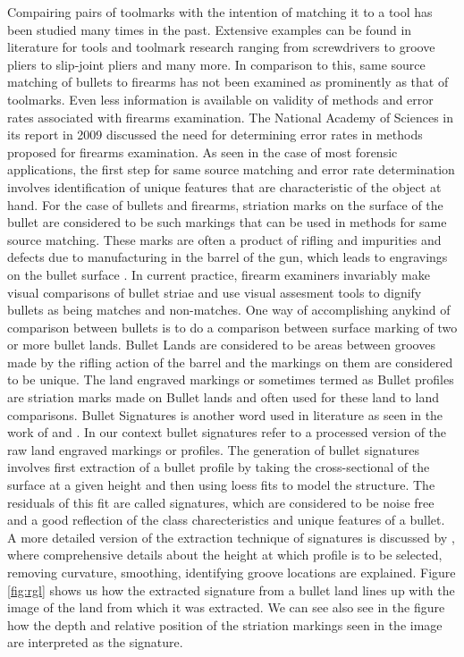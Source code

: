\documentclass[12pt]{article}
\begin{document}
Compairing pairs of toolmarks with the intention of matching it to a
tool has been studied many times in the past. Extensive examples can be
found in literature for tools and toolmark research ranging from
screwdrivers \citep{manytoolmarks1, manytoolmarks2, chumbley} to groove
pliers \citep{manytoolmarks2} to slip-joint pliers \citep{afte-chumbley}
and many more. In comparison to this, same source matching of bullets to
firearms has not been examined as prominently as that of toolmarks. Even
less information is available on validity of methods and error rates
associated with firearms examination. The National Academy of Sciences
in its report in 2009 \citep{NAS:2009} discussed the need for
determining error rates in methods proposed for firearms examination. As
seen in the case of most forensic applications, the first step for same
source matching and error rate determination involves identification of
unique features that are characteristic of the object at hand. For the
case of bullets and firearms, striation marks on the surface of the
bullet are considered to be such markings that can be used in methods
for same source matching. These marks are often a product of rifling and
impurities and defects due to manufacturing in the barrel of the gun,
which leads to engravings on the bullet surface
\citep{afte-article1992}. In current practice, firearm examiners
invariably make visual comparisons of bullet striae and use visual
assesment tools to dignify bullets as being matches and non-matches. One
way of accomplishing anykind of comparison between bullets is to do a
comparison between surface marking of two or more bullet lands. Bullet
Lands are considered to be areas between grooves made by the rifling
action of the barrel and the markings on them are considered to be
unique. The land engraved markings or sometimes termed as Bullet
profiles \citep{aoas} are striation marks made on Bullet lands and often
used for these land to land comparisons. Bullet Signatures is another
word used in literature as seen in the work of \citet{chu2013} and
\citet{aoas}. In our context bullet signatures refer to a processed
version of the raw land engraved markings or profiles. The generation of
bullet signatures involves first extraction of a bullet profile by
taking the cross-sectional of the surface at a given height and then
using loess fits to model the structure. The residuals of this fit are
called signatures, which are considered to be noise free and a good
reflection of the class charecteristics and unique features of a bullet.
A more detailed version of the extraction technique of signatures is
discussed by \citet{aoas}, where comprehensive details about the height
at which profile is to be selected, removing curvature, smoothing,
identifying groove locations are explained. Figure \ref{fig:rgl} shows
us how the extracted signature from a bullet land lines up with the
image of the land from which it was extracted. We can see also see in
the figure how the depth and relative position of the striation markings
seen in the image are interpreted as the signature.
\end{document}

